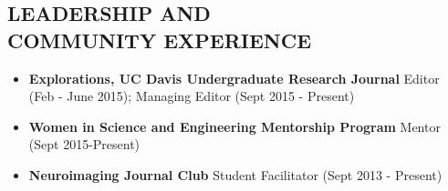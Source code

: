 \documentclass[line,margin,10pt]{res}
\begin{document}
\begin{resume}
                    
 \section{LEADERSHIP AND\\ COMMUNITY EXPERIENCE}
 \begin{itemize}[leftmargin=-2pt]\itemsep -2pt
\item[] \textbf{Explorations, UC Davis Undergraduate Research Journal} Editor (Feb - June 2015); Managing Editor (Sept 2015 - Present)


\item[] \textbf{Women in Science and Engineering Mentorship Program} Mentor (Sept 2015-Present)

\item[]\textbf{Neuroimaging Journal Club} Student Facilitator (Sept 2013 - Present)


\end{itemize}
\end{resume}
\end{document}
